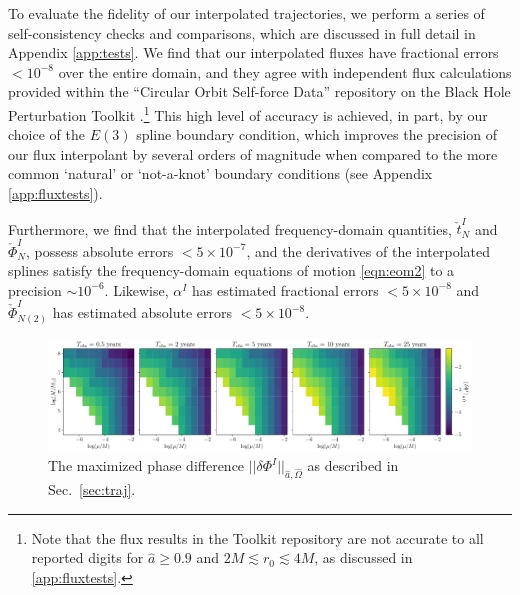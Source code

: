 \documentclass[%
 reprint,
 nofootinbib,
 amsmath,amssymb,
 aps,
 prd,
]{revtex4-2}
\begin{document}
To evaluate the fidelity of our interpolated trajectories, we perform a series of self-consistency checks and comparisons, which are discussed in full detail in Appendix \ref{app:tests}. We find that our interpolated fluxes have fractional errors $< 10^{-8}$ over the entire domain, and they agree with independent flux calculations \cite{TaraETC14, GralHughWarb16} provided within the ``Circular Orbit Self-force Data'' repository on the Black Hole Perturbation Toolkit \cite{BHPTK18}.\footnote{Note that the flux results in the Toolkit repository are not accurate to all reported digits for $\hat{a} \geq 0.9$ and $ 2M \lesssim r_0 \lesssim 4 M$, as discussed in \ref{app:fluxtests}.} This high level of accuracy is achieved, in part, by our choice of the $E(3)$ spline boundary condition, which improves the precision of our flux interpolant by several orders of magnitude when compared to the more common `natural' or `not-a-knot' boundary conditions (see Appendix \ref{app:fluxtests}). 

Furthermore, we find that the interpolated frequency-domain quantities, $\check{t}^I_N$ and $\check{\Phi}^I_N$, possess absolute errors $< 5\times 10^{-7}$, and the derivatives of the interpolated splines satisfy the frequency-domain equations of motion \eqref{eqn:eom2} to a precision $\sim 10^{-6}$. Likewise, $\alpha^I$ has estimated fractional errors $< 5\times 10^{-8}$ and $\check{\Phi}^I_{N(2)}$ has estimated absolute errors $< 5\times 10^{-8}$.

\begin{figure}[!htp]
    \centering
    \includegraphics[width=0.99\linewidth]{figures/deltaPhiTest.pdf}
    \caption{The maximized phase difference $||\delta \Phi^I||_{\hat{a}, \hat{\Omega}}$ as described in Sec.~\ref{sec:traj}.}
    \label{fig:obsTime}
\end{figure}
\end{document}

